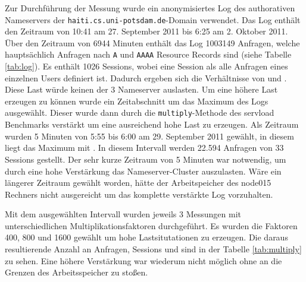 \documentclass[a4paper, 12pt, BCOR10mm, DIV12, toc=bibliography, toc=listof, german]{scrbook}
\begin{document}
		Zur Durchführung der  Messung wurde ein anonymisiertes Log des authorativen Nameservers der  
		\texttt{haiti.cs.uni-potsdam.de}-Domain verwendet. Das Log enthält den Zeitraum von 10:41 am 27.
		September 2011 bis 6:25 am 2. Oktober 2011. Über den Zeitraum von 6944 Minuten enthält das Log
		1003149 Anfragen, welche hauptsächlich Anfragen nach \texttt{A} und \texttt{AAAA} Resource
		Records sind (siehe Tabelle \ref{tab:log}). Es enthält 1026 Sessions, wobei eine Session als
		alle Anfragen eines einzelnen Users definiert ist. Dadurch ergeben sich die Verhältnisse von
		\unit[9,33]{} und \unit[977,63]{}. Diese
		Last würde keinen der 3 Nameserver auslasten. Um eine höhere Last erzeugen zu können wurde ein
		Zeitabschnitt um das Maximum des Logs ausgewählt. Dieser wurde dann durch die
		\texttt{multiply}-Methode des servload Benchmarks verstärkt um eine ausreichend hohe Last zu
		erzeugen. Als Zeitraum wurden 5 Minuten von 5:55 bis 6:00 am 29. September 2011 gewählt, in
		diesem liegt das Maximum mit \unit[204]{}. In diesem Intervall
		werden 22.594 Anfragen von 33 Sessions gestellt. Der sehr kurze Zeitraum von 5 Minuten war
		notwendig, um durch eine hohe Verstärkung das Nameserver-Cluster auszulasten. Wäre ein
		längerer Zeitraum gewählt worden, hätte der Arbeitspeicher des node015 Rechners nicht
		ausgereicht um das komplette verstärkte Log vorzuhalten.
		
		Mit dem ausgewählten Intervall wurden jeweils 3 Messungen mit unterschiedlichen
		Multiplikationsfaktoren durchgeführt. Es wurden die Faktoren 400, 800 und 1600 gewählt um hohe
		Lastsitutationen zu erzeugen. Die daraus resultierende Anzahl an Anfragen, Sessions und
		 sind in der Tabelle \ref{tab:multiply} zu sehen. Eine höhere
		Verstärkung war wiederum nicht möglich ohne an die Grenzen des Arbeitsspeicher zu stoßen.
\end{document}

